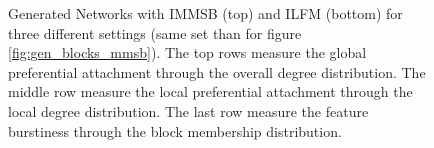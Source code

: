 \begin{figure}[ht]
	\endminipage
    \caption{Generated Networks with IMMSB (top) and ILFM (bottom) for three different settings (same set than for figure \ref{fig:gen_blocks_mmsb}). The top rows measure the global preferential attachment through the overall degree distribution. The middle row measure the local preferential attachment through the local degree distribution. The last row measure the feature burstiness through the block membership distribution.}
	\label{fig:gen_burst}
\end{figure}

